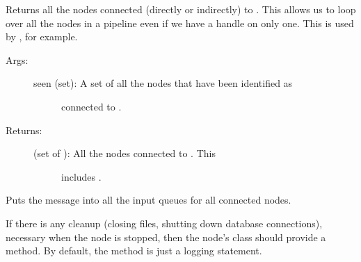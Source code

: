 \documentclass[letterpaper,10pt,english]{sphinxmanual}
\begin{document}
\begin{fulllineitems}
\begin{fulllineitems}
\end{fulllineitems}


\begin{fulllineitems}
\label{\detokenize{api:nanostream.node.NanoNode.all_connected}}
Returns all the nodes connected (directly or indirectly) to .
This allows us to loop over all the nodes in a pipeline even if we
have a handle on only one. This is used by , for 
example.
\begin{description}
\item[{Args:}] \leavevmode\begin{description}
\item[{seen (set): A set of all the nodes that have been identified as}] \leavevmode
connected to .

\end{description}

\item[{Returns:}] \leavevmode\begin{description}
\item[{(set of ): All the nodes connected to . This}] \leavevmode
includes .

\end{description}

\end{description}

\end{fulllineitems}


\begin{fulllineitems}
\label{\detokenize{api:nanostream.node.NanoNode.broadcast}}
Puts the message into all the input queues for all connected nodes.

\end{fulllineitems}


\begin{fulllineitems}
\label{\detokenize{api:nanostream.node.NanoNode.cleanup}}
If there is any cleanup (closing files, shutting down database connections),
necessary when the node is stopped, then the node’s class should provide
a  method. By default, the method is just a logging statement.


\end{fulllineitems}
\end{fulllineitems}
\end{document}
